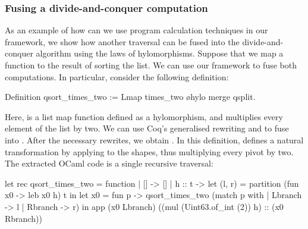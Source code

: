 \documentclass[a4paper,anonymous, UKenglish,cleveref, autoref, thm-restate]{lipics-v2021}
\begin{document}
\subsubsection{Fusing a divide-and-conquer computation}
As an example of how can we use program calculation techniques in our 
framework, we show how another traversal can be fused into the
divide-and-conquer algorithm using the laws of hylomorphisms.
Suppose that we map a function to the result of sorting the list. We can
use our framework to fuse both computations. In particular, consider
the following definition:
\begin{coqcode}
Definition qsort_times_two := Lmap times_two \o hylo merge qsplit.
\end{coqcode}
Here,  is a list map function defined as a hylomorphism,
and  multiplies every element of the list by two.
We can use Coq's generalised rewriting and  to fuse
 into .
After the necessary rewrites, we obtain
.
In this definition,  defines a natural transformation by
applying  to the shapes, thus multiplying every pivot by two.
The extracted OCaml code
is a single recursive traversal:
\begin{ocamlcode}
let rec qsort_times_two = function | [] -> []
| h :: t -> let (l, r) = partition (fun x0 -> leb x0 h) t in
            let x0 = fun p -> qsort_times_two (match p with
                                 | Lbranch -> l | Rbranch -> r) in
            app (x0 Lbranch) ((mul (Uint63.of_int (2)) h) :: (x0 Rbranch))
\end{ocamlcode}
\end{document}
